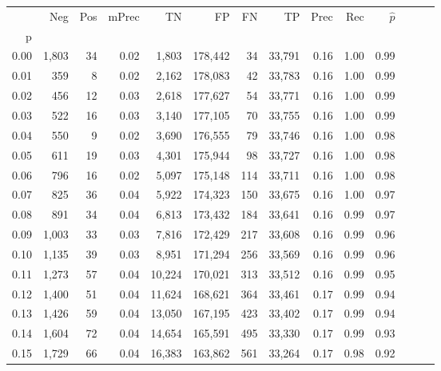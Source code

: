 \begin{tabular}{rrrrrrrrrrrrrr}
\toprule
{} &    Neg &  Pos & mPrec &       TN &       FP &      FN &      TP &  Prec &   Rec & $\hat{p}$ \\
p    &        &      &       &          &          &         &         &       &       &           \\
\midrule
0.00 &  1,803 &   34 &  0.02 &    1,803 &  178,442 &      34 &  33,791 &  0.16 &  1.00 &      0.99 \\
0.01 &    359 &    8 &  0.02 &    2,162 &  178,083 &      42 &  33,783 &  0.16 &  1.00 &      0.99 \\
0.02 &    456 &   12 &  0.03 &    2,618 &  177,627 &      54 &  33,771 &  0.16 &  1.00 &      0.99 \\
0.03 &    522 &   16 &  0.03 &    3,140 &  177,105 &      70 &  33,755 &  0.16 &  1.00 &      0.99 \\
0.04 &    550 &    9 &  0.02 &    3,690 &  176,555 &      79 &  33,746 &  0.16 &  1.00 &      0.98 \\
0.05 &    611 &   19 &  0.03 &    4,301 &  175,944 &      98 &  33,727 &  0.16 &  1.00 &      0.98 \\
0.06 &    796 &   16 &  0.02 &    5,097 &  175,148 &     114 &  33,711 &  0.16 &  1.00 &      0.98 \\
0.07 &    825 &   36 &  0.04 &    5,922 &  174,323 &     150 &  33,675 &  0.16 &  1.00 &      0.97 \\
0.08 &    891 &   34 &  0.04 &    6,813 &  173,432 &     184 &  33,641 &  0.16 &  0.99 &      0.97 \\
0.09 &  1,003 &   33 &  0.03 &    7,816 &  172,429 &     217 &  33,608 &  0.16 &  0.99 &      0.96 \\
0.10 &  1,135 &   39 &  0.03 &    8,951 &  171,294 &     256 &  33,569 &  0.16 &  0.99 &      0.96 \\
0.11 &  1,273 &   57 &  0.04 &   10,224 &  170,021 &     313 &  33,512 &  0.16 &  0.99 &      0.95 \\
0.12 &  1,400 &   51 &  0.04 &   11,624 &  168,621 &     364 &  33,461 &  0.17 &  0.99 &      0.94 \\
0.13 &  1,426 &   59 &  0.04 &   13,050 &  167,195 &     423 &  33,402 &  0.17 &  0.99 &      0.94 \\
0.14 &  1,604 &   72 &  0.04 &   14,654 &  165,591 &     495 &  33,330 &  0.17 &  0.99 &      0.93 \\
0.15 &  1,729 &   66 &  0.04 &   16,383 &  163,862 &     561 &  33,264 &  0.17 &  0.98 &      0.92 \\

\end{tabular}
